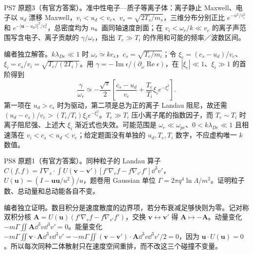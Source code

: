 \begin{exercise}\label{ex:hist02-7-3}
PS7 原题3（有官方答案）。准中性电子—质子等离子体：离子静止 Maxwell、电子以 $u_d$ 漂移 Maxwell，$v_i<u_d<v_e$、$v_s=\sqrt{2T_s/m_s}$，三维分布分别正比 $e^{-u^2/v_i^2}$ 和 $e^{-|\mathbf u-u_d\hat z|^2/v_e^2}$，总密度均为 $n$。画同轴速度剖面；在 $v_i<\omega_r/k\ll v_e$ 的离子声范围写含电子、离子贡献的 $\gamma/\omega_r$，指出 $T_e\gg T_i$ 的作用和可能的频率／波数区间。
\end{exercise}
\begin{solution}
编者独立解答。$k\lambda_{De}\ll1$ 时 $\omega_r\simeq kc_s$，$c_s=\sqrt{T_e/m_i}$；令 $\xi_e=(c_s-u_d)/v_e$、$\xi_i=c_s/v_i=\sqrt{T_e/(2T_i)}$。用 $\gamma=-\operatorname{Im}\epsilon/(\partial_\omega\operatorname{Re}\epsilon)$，在 $|\xi_e|\ll1$、$\xi_i\gg1$ 的首阶得到
\begin{equation}\frac\gamma{\omega_r}\simeq-\frac{\sqrt\pi}{2}\left[\frac{c_s-u_d}{v_e}+\frac{T_e}{T_i}\xi_i e^{-\xi_i^2}\right].\end{equation}
第一项在 $u_d>c_s$ 时为驱动，第二项是总为正的离子 Landau 阻尼，故还需 $(u_d-c_s)/v_e>(T_e/T_i)\xi_i e^{-\xi_i^2}$。$T_e\gg T_i$ 压小离子尾的指数因子，而 $T_e\sim T_i$ 时离子阻尼强、上述大 $\xi_i$ 渐近式也失效。可能范围是 $\omega_r\ll\omega_{pe}$、$0<k\lambda_{De}\ll1$ 且相速落在 $v_i<c_s<u_d<v_e$；给定题面没有单独的 $u_d,T_e,T_i$ 数字，不应虚构唯一 $k$ 数值。
\end{solution}

\begin{exercise}\label{ex:hist02-8-1}
PS8 原题1（有官方答案）。同种粒子的 Landau 算子 $C(f,f)=\Gamma\nabla_v\cdot\int U(\mathbf v-\mathbf v')[f'\nabla_vf-f\nabla_{v'}f']\dd^3v'$，$U(\mathbf u)=(I-\mathbf u\mathbf u/u^2)/u$，题卷用 Gaussian 单位 $\Gamma=2\pi q^4\ln\Lambda/m^2$。证明粒子数、总动量和总动能各自不变。
\end{exercise}
\begin{solution}
编者独立证明。数目积分是速度散度的边界项，若分布衰减足够快则为零。记对称双积分核 $\mathbf A=U(\mathbf u)(f'\nabla_vf-f\nabla_{v'}f')$，交换 $\mathbf v\leftrightarrow\mathbf v'$ 得 $\mathbf A\mapsto-\mathbf A$。动量变化 $-m\Gamma\iint\mathbf A\dd^3v\dd^3v'=0$。能量变化 $-m\Gamma\iint\mathbf v\cdot\mathbf A\dd^3v\dd^3v'=-m\Gamma\iint(\mathbf v-\mathbf v')\cdot\mathbf A\dd^3v\dd^3v'/2=0$，因为 $\mathbf u\cdot U(\mathbf u)=0$。所以每次同种二体散射只在速度空间重排，而不改这三个碰撞不变量。
\end{solution}

